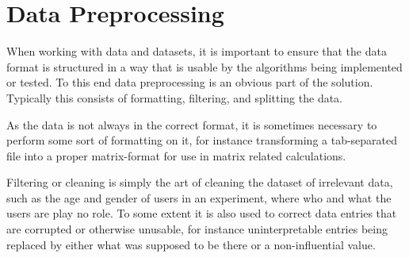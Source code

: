 \section{Data Preprocessing}
When working with data and datasets, it is important to ensure that the data format is structured in a way that is usable by the algorithms being implemented or tested\cite{preprocessing}. To this end data preprocessing is an obvious part of the solution. Typically this consists of formatting, filtering, and splitting the data.

As the data is not always in the correct format, it is sometimes necessary to perform some sort of formatting on it, for instance transforming a tab-separated file into a proper matrix-format for use in matrix related calculations.

Filtering or cleaning is simply the art of cleaning the dataset of irrelevant data, such as the age and gender of users in an experiment, where who and what the users are play no role. To some extent it is also used to correct data entries that are corrupted or otherwise unusable, for instance uninterpretable entries being replaced by either what was supposed to be there or a non-influential value.

